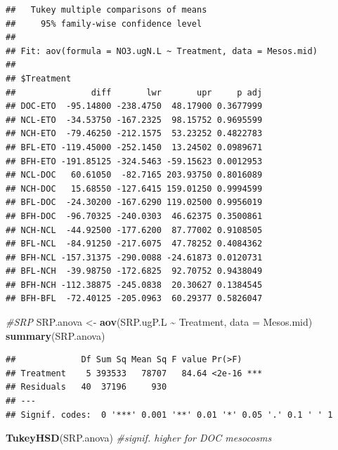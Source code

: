 \documentclass[
]{article}
\newenvironment{Shaded}{\begin{snugshade}}{\end{snugshade}}
\newcommand{\AttributeTok}[1]{\textcolor[rgb]{0.13,0.29,0.53}{#1}}
\newcommand{\CommentTok}[1]{\textcolor[rgb]{0.56,0.35,0.01}{\textit{#1}}}
\newcommand{\FunctionTok}[1]{\textcolor[rgb]{0.13,0.29,0.53}{\textbf{#1}}}
\newcommand{\NormalTok}[1]{#1}
\newcommand{\OtherTok}[1]{\textcolor[rgb]{0.56,0.35,0.01}{#1}}
\newcommand{\SpecialCharTok}[1]{\textcolor[rgb]{0.81,0.36,0.00}{\textbf{#1}}}
\begin{document}
\begin{verbatim}
##   Tukey multiple comparisons of means
##     95% family-wise confidence level
## 
## Fit: aov(formula = NO3.ugN.L ~ Treatment, data = Mesos.mid)
## 
## $Treatment
##               diff       lwr       upr     p adj
## DOC-ETO  -95.14800 -238.4750  48.17900 0.3677999
## NCL-ETO  -34.53750 -167.2325  98.15752 0.9695599
## NCH-ETO  -79.46250 -212.1575  53.23252 0.4822783
## BFL-ETO -119.45000 -252.1450  13.24502 0.0989671
## BFH-ETO -191.85125 -324.5463 -59.15623 0.0012953
## NCL-DOC   60.61050  -82.7165 203.93750 0.8016089
## NCH-DOC   15.68550 -127.6415 159.01250 0.9994599
## BFL-DOC  -24.30200 -167.6290 119.02500 0.9956019
## BFH-DOC  -96.70325 -240.0303  46.62375 0.3500861
## NCH-NCL  -44.92500 -177.6200  87.77002 0.9108505
## BFL-NCL  -84.91250 -217.6075  47.78252 0.4084362
## BFH-NCL -157.31375 -290.0088 -24.61873 0.0120731
## BFL-NCH  -39.98750 -172.6825  92.70752 0.9438049
## BFH-NCH -112.38875 -245.0838  20.30627 0.1384545
## BFH-BFL  -72.40125 -205.0963  60.29377 0.5826047
\end{verbatim}

\begin{Shaded}
\begin{Highlighting}[]
\CommentTok{\#SRP}
\NormalTok{SRP.anova }\OtherTok{\textless{}{-}} \FunctionTok{aov}\NormalTok{(SRP.ugP.L }\SpecialCharTok{\textasciitilde{}}\NormalTok{ Treatment, }\AttributeTok{data =}\NormalTok{ Mesos.mid)}
\FunctionTok{summary}\NormalTok{(SRP.anova)}
\end{Highlighting}
\end{Shaded}

\begin{verbatim}
##             Df Sum Sq Mean Sq F value Pr(>F)    
## Treatment    5 393533   78707   84.64 <2e-16 ***
## Residuals   40  37196     930                   
## ---
## Signif. codes:  0 '***' 0.001 '**' 0.01 '*' 0.05 '.' 0.1 ' ' 1
\end{verbatim}

\begin{Shaded}
\begin{Highlighting}[]
\FunctionTok{TukeyHSD}\NormalTok{(SRP.anova) }\CommentTok{\#signif. higher for DOC mesocosms}
\end{Highlighting}
\end{Shaded}
\end{document}
